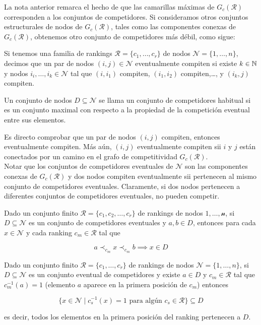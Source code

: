 La nota anterior remarca el hecho de que las camarillas máximas de $G_c(\mathcal{R})$ corresponden a los conjuntos de competidores. Si consideramos otros conjuntos estructurales de nodos de $G_c(\mathcal{R})$, tales como las componentes conexas de $G_c(\mathcal{R})$, obtenemos otro conjunto de competidores más débil, como sigue:

\begin{defi}
Si tenemos una familia de rankings $\mathcal{R} = \{c_1,\dots,c_r\}$ de nodos $\mathcal{N} = \{1,\dots,n\}$, decimos que un par de nodos $(i,j) \in \mathcal{N}$ eventualmente compiten si existe $k \in \mathbb{N}$ y nodos $i_i,\dots,i_k \in \mathcal{N}$ tal que $(i,i_1)$ compiten, $(i_1,i_2)$ compiten,\dots, y $(i_k,j)$ compiten. 
\end{defi}

\begin{defi}
Un conjunto de nodos $D \subseteq \mathcal{N}$ se llama un conjunto de competidores habitual si es un conjunto maximal con respecto a la propiedad de la competición eventual entre sus elementos.
\end{defi}


\begin{nota}
Es directo comprobar que un par de nodos $(i,j)$ compiten, entonces eventualmente compiten. Más aún, $(i,j)$ eventualmente compiten sii $i$ y $j$ están conectados por un camino en el grafo de competitividad $G_c(\mathcal{R})$.\\

Notar que los conjuntos de competidores eventuales de $\mathcal{N}$ son las componentes conexas de $G_c(\mathcal{R})$ y dos nodos compiten eventualmente sii pertenecen al mismo conjunto de competidores eventuales. Claramente, si dos nodos pertenecen a diferentes conjuntos de competidores eventuales, no pueden competir. 
\end{nota}

\begin{lema}
Dado un conjunto finito $\mathcal{R} = \{c_1,c_2,\dots,c_r\}$ de rankings de nodos $\mathcal{1,\dots,n}$, si $D \subseteq \mathcal{N}$ es un conjunto de competidores eventuales y $a,b \in D$, entonces para cada $x \in \mathcal{N}$ y cada ranking $c_m \in \mathcal{R}$ tal que

\[ a \prec_{c_m} x \prec_{c_m} b \implies x \in D \] 
\end{lema}

\begin{lema}
Dado un conjunto finito $\mathcal{R} = \{c_1,\dots,c_r\}$ de rankings de nodos $\mathcal{N} = \{1,\dots,n\}$, si $D \subseteq \mathcal{N}$ es un conjunto eventual de competidores y existe $a \in D$ y $c_m \in \mathcal{R}$ tal que $c_m^{-1}(a) = 1$ (elemento $a$ aparece en la primera posición de $c_m$) entonces

\[ \{x \in \mathcal{N} \mid c_s^{-1}(x) = 1 \text{ para algún } c_s \in \mathcal{R} \} \subseteq D \]

es decir, todos los elementos en la primera posición del ranking pertenecen a $D$.
\end{lema}

